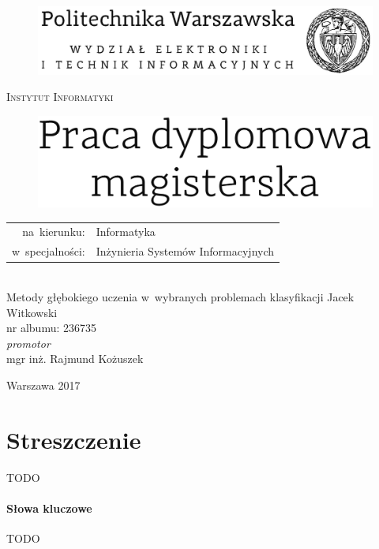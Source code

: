 \documentclass[12pt,a4paper,twoside]{report}
\begin{document}
\begin{titlepage}
  \begin{center}

    \begin{figure}[H]
	\centering
	\includegraphics[width=0.8\linewidth]{img/elka-logo.png}
    \end{figure}


    \textsc{\Large Instytut Informatyki}\\[4.0cm]

    \begin{figure}[H]
	\centering
	\includegraphics[width=0.8\linewidth]{img/pr-dyplomowa-text.png}
    \end{figure}
    \normalsize
    \begin{tabular}{rl}
      na~kierunku:& Informatyka \\
      w~specjalności:& Inżynieria Systemów Informacyjnych
     \end{tabular} \\[1.5cm]

    \Large Metody głębokiego uczenia w~wybranych problemach klasyfikacji
    \vfill
    \Huge Jacek Witkowski \\
    \normalsize nr albumu: 236735 \\[0.5cm]

    \normalsize \textit{promotor}\\
    mgr inż. Rajmund Kożuszek
    \vfill

    {\large Warszawa 2017}

  \end{center}
\end{titlepage}
\raggedbottom
\thispagestyle{empty} %
\section*{Streszczenie}
TODO
\paragraph{Słowa kluczowe} TODO
\end{document}

